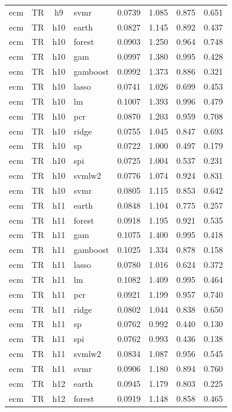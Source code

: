 \begin{ThreePartTable}
\begin{longtable}[t]{llclcccc}
ecm & TR & h9 & svmr & 0.0739 & 1.085 & 0.875 & 0.651\\
\addlinespace
ecm & TR & h10 & earth & 0.0827 & 1.145 & 0.892 & 0.437\\
ecm & TR & h10 & forest & 0.0903 & 1.250 & 0.964 & 0.748\\
ecm & TR & h10 & gam & 0.0997 & 1.380 & 0.995 & 0.428\\
ecm & TR & h10 & gamboost & 0.0992 & 1.373 & 0.886 & 0.321\\
ecm & TR & h10 & lasso & 0.0741 & 1.026 & 0.699 & 0.453\\
ecm & TR & h10 & lm & 0.1007 & 1.393 & 0.996 & 0.479\\
ecm & TR & h10 & pcr & 0.0870 & 1.203 & 0.959 & 0.708\\
ecm & TR & h10 & ridge & 0.0755 & 1.045 & 0.847 & 0.693\\
ecm & TR & h10 & sp & 0.0722 & 1.000 & 0.497 & 0.179\\
ecm & TR & h10 & spi & 0.0725 & 1.004 & 0.537 & 0.231\\
ecm & TR & h10 & svmlw2 & 0.0776 & 1.074 & 0.924 & 0.831\\
ecm & TR & h10 & svmr & 0.0805 & 1.115 & 0.853 & 0.642\\
\addlinespace
ecm & TR & h11 & earth & 0.0848 & 1.104 & 0.775 & 0.257\\
ecm & TR & h11 & forest & 0.0918 & 1.195 & 0.921 & 0.535\\
ecm & TR & h11 & gam & 0.1075 & 1.400 & 0.995 & 0.418\\
ecm & TR & h11 & gamboost & 0.1025 & 1.334 & 0.878 & 0.158\\
ecm & TR & h11 & lasso & 0.0780 & 1.016 & 0.624 & 0.372\\
ecm & TR & h11 & lm & 0.1082 & 1.409 & 0.995 & 0.464\\
ecm & TR & h11 & pcr & 0.0921 & 1.199 & 0.957 & 0.740\\
ecm & TR & h11 & ridge & 0.0802 & 1.044 & 0.838 & 0.650\\
ecm & TR & h11 & sp & 0.0762 & 0.992 & 0.440 & 0.130\\
ecm & TR & h11 & spi & 0.0762 & 0.993 & 0.436 & 0.138\\
ecm & TR & h11 & svmlw2 & 0.0834 & 1.087 & 0.956 & 0.545\\
ecm & TR & h11 & svmr & 0.0906 & 1.180 & 0.894 & 0.760\\
\addlinespace
ecm & TR & h12 & earth & 0.0945 & 1.179 & 0.803 & 0.225\\
ecm & TR & h12 & forest & 0.0919 & 1.148 & 0.858 & 0.465\\

\end{longtable}
\end{ThreePartTable}
